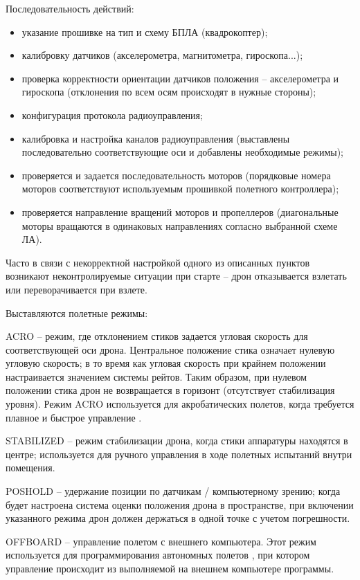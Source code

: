 Последовательность действий:
\begin{itemize}
	\item указание прошивке на тип и схему БПЛА (квадрокоптер);
	\item калибровку датчиков (акселерометра, магнитометра, гироскопа...);
	\item проверка корректности ориентации датчиков положения -- акселерометра и гироскопа (отклонения по всем осям происходят в нужные стороны);
	\item конфигурация протокола радиоуправления;
	\item калибровка и настройка каналов радиоуправления (выставлены последовательно соответствующие оси и добавлены необходимые режимы);
	\item проверяется и задается последовательность моторов (порядковые номера моторов соответствуют используемым прошивкой полетного контроллера);
	\item проверяется направление вращений моторов и пропеллеров (диагональные моторы вращаются в одинаковых направлениях согласно выбранной схеме ЛА).
\end{itemize}

Часто в связи с некорректной настройкой одного из описанных пунктов возникают неконтролируемые ситуации при старте -- дрон отказывается взлетать или переворачивается при взлете.

Выставляются полетные режимы:

ACRO -- режим, где отклонением стиков задается угловая скорость для соответствующей оси дрона. Центральное положение стика означает нулевую угловую скорость; в то время как угловая скорость при крайнем положении настраивается значением системы рейтов. Таким образом, при нулевом положении стика дрон не возвращается в горизонт (отсутствует стабилизация уровня). Режим ACRO используется для акробатических полетов, когда требуется плавное и быстрое управление \cite{ardupilot}.

STABILIZED -- режим стабилизации дрона, когда стики аппаратуры находятся в центре; используется для ручного управления в ходе полетных испытаний внутри помещения.

POSHOLD -- удержание позиции по датчикам / компьютерному зрению; когда будет настроена система оценки положения дрона в пространстве, при включении указанного режима дрон должен держаться в одной точке с учетом погрешности.

OFFBOARD -- управление полетом с внешнего компьютера. Этот режим используется для программирования автономных полетов \cite{clover}, при котором управление происходит из выполняемой на внешнем компьютере программы.

